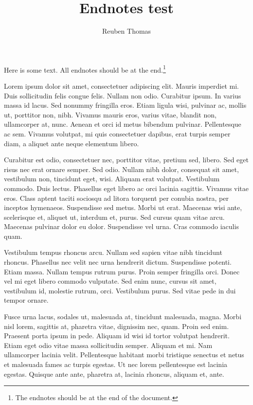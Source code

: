 \documentclass{article}
\begin{document}
\title{Endnotes test}
\author{Reuben Thomas}
\maketitle

Here is some text.
All endnotes should be at the end.\footnote{The endnotes should be at the
end of the document.}

Lorem ipsum dolor sit amet, consectetuer adipiscing elit. Mauris imperdiet mi.
Duis sollicitudin felis congue felis. Nullam non odio. Curabitur ipsum. In
varius massa id lacus. Sed nonummy fringilla eros. Etiam ligula wisi, pulvinar
ac, mollis ut, porttitor non, nibh. Vivamus mauris eros, varius vitae, blandit
non, ullamcorper at, nunc. Aenean et orci id metus bibendum pulvinar.
Pellentesque ac sem. Vivamus volutpat, mi quis consectetuer dapibus, erat turpis
semper diam, a aliquet ante neque elementum libero.

Curabitur est odio, consectetuer nec, porttitor vitae, pretium sed, libero. Sed
eget risus nec erat ornare semper. Sed odio. Nullam nibh dolor, consequat sit
amet, vestibulum non, tincidunt eget, wisi. Aliquam erat volutpat. Vestibulum
commodo. Duis lectus. Phasellus eget libero ac orci lacinia sagittis. Vivamus
vitae eros. Class aptent taciti sociosqu ad litora torquent per conubia nostra,
per inceptos hymenaeos. Suspendisse sed metus. Morbi ut erat. Maecenas wisi
ante, scelerisque et, aliquet ut, interdum et, purus. Sed cursus quam vitae
arcu. Maecenas pulvinar dolor eu dolor. Suspendisse vel urna. Cras commodo
iaculis quam.

Vestibulum tempus rhoncus arcu. Nullam sed sapien vitae nibh tincidunt rhoncus.
Phasellus nec velit nec urna hendrerit dictum. Suspendisse potenti. Etiam massa.
Nullam tempus rutrum purus. Proin semper fringilla orci. Donec vel mi eget
libero commodo vulputate. Sed enim nunc, cursus sit amet, vestibulum id,
molestie rutrum, orci. Vestibulum purus. Sed vitae pede in dui tempor ornare.

Fusce urna lacus, sodales ut, malesuada at, tincidunt malesuada, magna. Morbi
nisl lorem, sagittis at, pharetra vitae, dignissim nec, quam. Proin sed enim.
Praesent porta ipsum in pede. Aliquam id wisi id tortor volutpat hendrerit.
Etiam eget odio vitae massa sollicitudin semper. Aliquam et mi. Nam ullamcorper
lacinia velit. Pellentesque habitant morbi tristique senectus et netus et
malesuada fames ac turpis egestas. Ut nec lorem pellentesque est lacinia
egestas. Quisque ante ante, pharetra at, lacinia rhoncus, aliquam et, ante.
\end{document}
